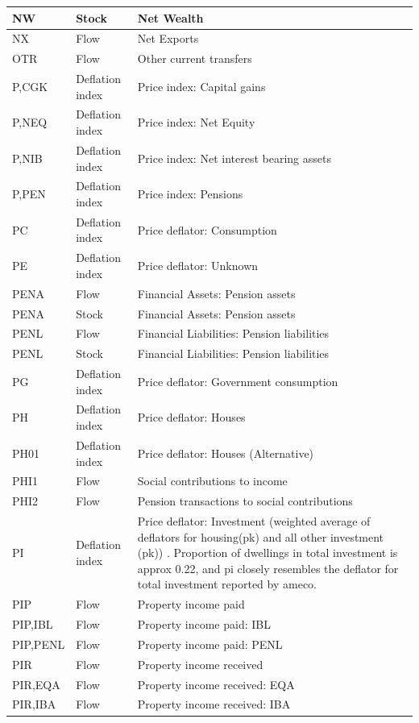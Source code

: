 \documentclass[
]{book}
\begin{document}
\begin{tabular}[t]{l|l|l}
\hline
NW & Stock & Net Wealth\\
\hline
NX & Flow & Net Exports\\
\hline
OTR & Flow & Other current transfers\\
\hline
P,CGK & Deflation index & Price index: Capital gains\\
\hline
P,NEQ & Deflation index & Price index: Net Equity\\
\hline
P,NIB & Deflation index & Price index: Net interest bearing assets\\
\hline
P,PEN & Deflation index & Price index: Pensions\\
\hline
PC & Deflation index & Price deflator: Consumption\\
\hline
PE & Deflation index & Price deflator: Unknown\\
\hline
PENA & Flow & Financial Assets: Pension assets\\
\hline
PENA & Stock & Financial Assets: Pension assets\\
\hline
PENL & Flow & Financial Liabilities: Pension liabilities\\
\hline
PENL & Stock & Financial Liabilities: Pension liabilities\\
\hline
PG & Deflation index & Price deflator: Government consumption\\
\hline
PH & Deflation index & Price deflator: Houses\\
\hline
PH01 & Deflation index & Price deflator: Houses (Alternative)\\
\hline
PHI1 & Flow & Social contributions to income\\
\hline
PHI2 & Flow & Pension transactions to social contributions\\
\hline
PI & Deflation index & Price deflator: Investment (weighted average of deflators for housing(pk) and all other investment (pk)) . Proportion of dwellings in total investment is approx 0.22, and pi closely resembles the deflator for total investment reported by ameco.\\
\hline
PIP & Flow & Property income paid\\
\hline
PIP,IBL & Flow & Property income paid: IBL\\
\hline
PIP,PENL & Flow & Property income paid: PENL\\
\hline
PIR & Flow & Property income received\\
\hline
PIR,EQA & Flow & Property income received: EQA\\
\hline
PIR,IBA & Flow & Property income received: IBA\\

\end{tabular}
\end{document}
